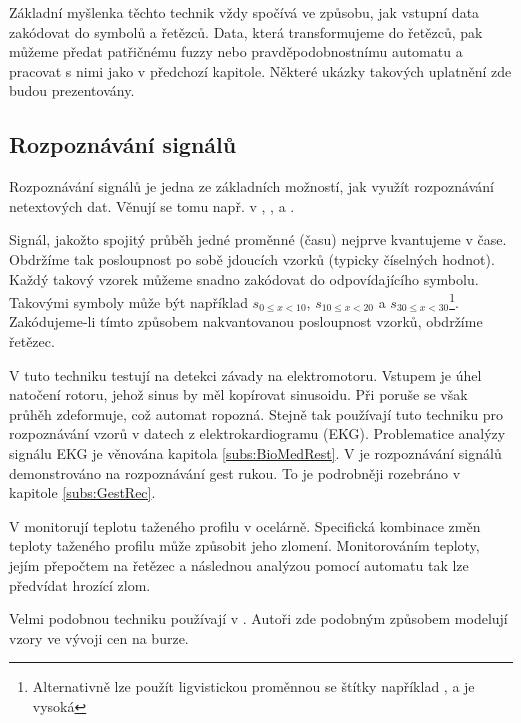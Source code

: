 \documentclass[a4paper,10pt]{article}
\begin{document}
Základní myšlenka těchto technik vždy spočívá ve způsobu, jak vstupní data zakódovat do symbolů a řetězců. Data, která transformujeme do řetězců, pak můžeme předat patřičnému fuzzy nebo pravděpodobnostnímu automatu a pracovat s nimi jako v předchozí kapitole. Některé ukázky takových uplatnění zde budou prezentovány. 

\subsection{Rozpoznávání signálů} \label{subs:RozpSign}
Rozpoznávání signálů je jedna ze základních možností, jak využít rozpoznávání netextových dat. Věnují se tomu např. v \cite{MukRay-StaSplMerProbFiStaAuSigRepAna}, \cite{Rig-FauDetIsoBasFuzzAut}, \cite{BaiTri-PattRecUsiTemFuzzAut} a \cite{KemAda-SeqPatRecEmpRecFuzSys}.

Signál, jakožto spojitý průběh jedné proměnné (času) nejprve kvantujeme v čase. Obdržíme tak posloupnost po sobě jdoucích vzorků (typicky číselných hodnot). Každý takový vzorek můžeme snadno zakódovat do odpovídajícího symbolu. Takovými symboly může být například $s_{0 \leq x < 10}$, $s_{10 \leq x < 20}$ a $s_{30 \leq x < 30}$\footnote{Alternativně lze použít ligvistickou proměnnou se štítky například ,  a  je vysoká}. Zakódujeme-li tímto způsobem nakvantovanou posloupnost vzorků, obdržíme řetězec.


V \cite{Rig-FauDetIsoBasFuzzAut} tuto techniku testují na detekci závady na elektromotoru. Vstupem je úhel natočení rotoru, jehož sinus by měl kopírovat sinusoidu. Při poruše se však průhěh zdeformuje, což automat ropozná. Stejně tak používají tuto techniku pro rozpoznávání vzorů v datech z elektrokardiogramu (EKG). Problematice analýzy signálu EKG je věnována kapitola \ref{subs:BioMedRest}. V \cite{BaiTri-PattRecUsiTemFuzzAut} je rozpoznávání signálů demonstrováno na rozpoznávání gest rukou. To je podrobněji rozebráno v kapitole \ref{subs:GestRec}.

V \cite{KemAda-SeqPatRecEmpRecFuzSys} monitorují teplotu taženého profilu v ocelárně. Specifická kombinace změn teploty taženého profilu může způsobit jeho zlomení. Monitorováním teploty, jejím přepočtem na řetězec a následnou analýzou pomocí automatu tak lze předvídat hrozící zlom.

Velmi podobnou techniku používají v \cite{ManPra-PriPatDetUsFiStMaFuzTra}. Autoři zde podobným způsobem modelují vzory ve vývoji cen na burze.
\end{document}
